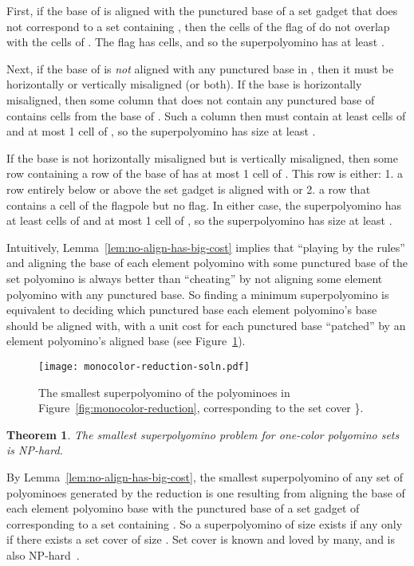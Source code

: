 \documentclass{article}
\newtheorem{theorem}{Theorem}[section]
\newenvironment{proof}[1][Proof]{\begin{trivlist}
\item[\hskip \labelsep {\bfseries #1}]}{\end{trivlist}}
\newcommand{\ccNP}{\textrm{\textsc{NP}}}
\begin{document}
\begin{proof}
First, if the base of  is aligned with the punctured base of a set gadget that does not correspond to a set containing , then the cells of the flag of  do not overlap with the cells of .
The flag has  cells, and so the superpolyomino has at least .

Next, if the base of  is \emph{not} aligned with any punctured base in , then it must be horizontally or vertically misaligned (or both).
If the base is horizontally misaligned, then some column that does not contain any punctured base of  contains cells from the base of .
Such a column then must contain at least  cells of  and at most 1 cell of , so the superpolyomino has size at least .

If the base is not horizontally misaligned but is vertically misaligned, then some row containing a row of the base of  has at most 1 cell of .
This row is either: 1. a row entirely below or above the set gadget  is aligned with or 2. a row that contains a cell of the flagpole but no flag. 
In either case, the superpolyomino has at least  cells of  and at most 1 cell of , so the superpolyomino has size at least .
\end{proof}

Intuitively, Lemma~\ref{lem:no-align-has-big-cost} implies that ``playing by the rules'' and aligning the base of each element polyomino with some punctured base of the set polyomino  is always better than ``cheating'' by not aligning some element polyomino with any punctured base.
So finding a minimum superpolyomino is equivalent to deciding which punctured base each element polyomino's base should be aligned with, with a unit cost for each punctured base ``patched'' by an element polyomino's aligned base (see Figure~\ref{fig:monocolor-reduction-soln}).

\begin{figure}[ht]
\centering
\texttt{[image: monocolor-reduction-soln.pdf]}
\caption{The smallest superpolyomino of the polyominoes in Figure~\ref{fig:monocolor-reduction}, corresponding to the set cover \}.}
\label{fig:monocolor-reduction-soln}
\end{figure}

\begin{theorem}
The smallest superpolyomino problem for one-color polyomino sets is \ccNP-hard.
\end{theorem}

\begin{proof}
By Lemma~\ref{lem:no-align-has-big-cost}, the smallest superpolyomino of any set of polyominoes generated by the reduction is one resulting from aligning the base of each element polyomino  base with the punctured base of a set gadget of  corresponding to a set containing .
So a superpolyomino of size  exists if any only if there exists a set cover of size .
Set cover is known and loved by many, and is also \ccNP-hard~\cite{Karp-1972}. 
\end{proof}
\end{document}
